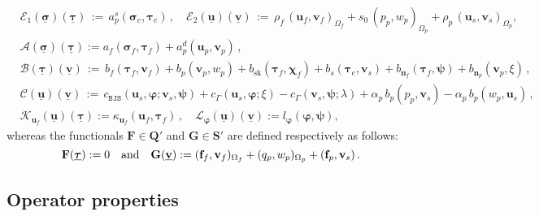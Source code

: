 \documentclass[11pt]{article}
\numberwithin{equation}{section}
\newcommand{\ds}{\displaystyle}
\newcommand{\bsi}{{\boldsymbol\sigma}}
\newcommand{\bvarphi}{{\boldsymbol\varphi}}
\newcommand{\bpsi}{{\boldsymbol\psi}}
\newcommand{\btau}{{\boldsymbol\tau}}
\newcommand{\bchi}{{\boldsymbol\chi}}
\newcommand{\ubsi}{\underline{\bsi}}
\newcommand{\ubtau}{\underline{\btau}}
\newcommand{\ubu}{\underline{\bu}}
\newcommand{\ubv}{\underline{\bv}}
\newcommand{\bv}{{\mathbf{v}}}
\newcommand{\f}{\mathbf{f}}
\newcommand{\bu}{\mathbf{u}}
\newcommand{\bn}{{\mathbf{n}}}
\newcommand{\0}{{\mathbf{0}}}
\def\bF{\mathbf{F}}
\def\bG{\mathbf{G}}
\def\bQ{\mathbf{Q}}
\def\bS{\mathbf{S}}
\newcommand{\cA}{\mathcal{A}}
\newcommand{\cB}{\mathcal{B}}
\newcommand{\cC}{\mathcal{C}}
\newcommand{\cE}{\mathcal{E}}
\newcommand{\cK}{\mathcal{K}}
\newcommand{\cL}{\mathcal{L}}
\def\BJS{\mathtt{BJS}}
\def\sk{\mathrm{sk}}
\def\qan{{\quad\hbox{and}\quad}}
\numberwithin{equation}{section}
\begin{document}
\begin{subequations}\label{operators-1}
\begin{align}
& \cE_1(\ubsi)(\ubtau) \,:=\, a^s_p(\bsi_e,\btau_e)\,,\quad 
\cE_2(\ubu)(\ubv) \,:=\, \rho_f\,(\bu_f,\bv_f)_{\Omega_f} + s_0\,(p_p,w_p)_{\Omega_p}
+ \rho_p\,(\bu_s,\bv_s)_{\Omega_p}, \label{defn-E1-E2}  \\[1ex]  
&\ds \cA(\ubsi)(\ubtau) := a_f(\bsi_f,\btau_f) + a^d_p(\bu_p,\bv_p)\,, \label{defn-A} \\[1ex]
&\ds \cB(\ubtau)(\ubv) \,:=\, b_f(\btau_f,\bv_f) + b_p(\bv_p,w_p) + b_\sk(\btau_f,\bchi_f) + b_s(\btau_e,\bv_s) + b_{\bn_f}(\btau_f,\bpsi) + b_{\bn_p}(\bv_p,\xi)\,, \label{defn-B} \\[1ex]
&\ds \cC(\ubu)(\ubv) \,:=\, c_\BJS(\bu_s,\bvarphi;\bv_s,\bpsi) + c_{\Gamma}(\bu_s,\bvarphi;\xi) - c_{\Gamma}(\bv_s,\bpsi;\lambda) + \alpha_p\,b_p(p_p,\bv_s) - \alpha_p\,b_p(w_p,\bu_s)\,, \label{defn-C} \\[1ex]
&\ds \cK_{\bu_f}(\ubu)(\ubtau) := \kappa_{\bu_f}(\bu_f,\btau_f)\,,\quad
\cL_{\bvarphi}(\ubu)(\ubv) := l_{\bvarphi}(\bvarphi,\bpsi),\label{defn-K-L}
\end{align}
\end{subequations}
%
whereas the functionals $\bF\in \bQ'$ and $\bG\in \bS'$ are defined respectively as follows:
\begin{equation}\label{operators-3}
\bF(\ubtau) := 0 \qan
\bG(\ubv) := (\f_f,\bv_f)_{\Omega_f} + (q_p,w_p)_{\Omega_p} + (\f_p,\bv_s) \,.
\end{equation}


\subsection{Operator properties}
\end{document}
